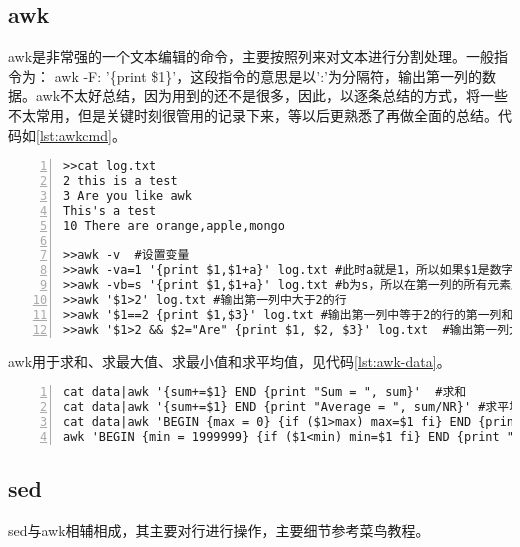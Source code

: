 \subsection{awk}
awk是非常强的一个文本编辑的命令，主要按照列来对文本进行分割处理。一般指令为： awk -F: '\{print \$1\}'，这段指令的意思是以':'为分隔符，输出第一列的数据。awk不太好总结，因为用到的还不是很多，因此，以逐条总结的方式，将一些不太常用，但是关键时刻很管用的记录下来，等以后更熟悉了再做全面的总结。代码如\ref{lst:awkcmd}。
\begin{lstlisting}[language = shell, numbers=left, label={lst:awkcmd},
     numberstyle=\tiny,keywordstyle=\color{blue!70}, caption={grep指令的一般性操作}
     commentstyle=\color{red!50!green!50!blue!50},frame=shadowbox,
     rulesepcolor=\color{red!20!green!20!blue!20},basicstyle=\ttfamily]
>>cat log.txt
2 this is a test
3 Are you like awk
This's a test
10 There are orange,apple,mongo

>>awk -v  #设置变量
>>awk -va=1 '{print $1,$1+a}' log.txt #此时a就是1，所以如果$1是数字，那么数字加一，如果不是，那么输出就是1
>>awk -vb=s '{print $1,$1+a}' log.txt #b为s，所以在第一列的所有元素后面加个s
>>awk '$1>2' log.txt #输出第一列中大于2的行
>>awk '$1==2 {print $1,$3}' log.txt #输出第一列中等于2的行的第一列和第三列
>>awk '$1>2 && $2="Are" {print $1, $2, $3}' log.txt  #输出第一列大于2的行的第一、二和三列
\end{lstlisting}

awk用于求和、求最大值、求最小值和求平均值，见代码\ref{lst:awk-data}。
\begin{lstlisting}[language = shell, numbers=left, label={lst:awk-data},
     numberstyle=\tiny,keywordstyle=\color{blue!70}, caption={grep指令的一般性操作}
     commentstyle=\color{red!50!green!50!blue!50},frame=shadowbox,
     rulesepcolor=\color{red!20!green!20!blue!20},basicstyle=\ttfamily]
cat data|awk '{sum+=$1} END {print "Sum = ", sum}'  #求和
cat data|awk '{sum+=$1} END {print "Average = ", sum/NR}' #求平均值
cat data|awk 'BEGIN {max = 0} {if ($1>max) max=$1 fi} END {print "Max=", max}' #求最大值
awk 'BEGIN {min = 1999999} {if ($1<min) min=$1 fi} END {print "Min=", min}' #求最小值
\end{lstlisting}
\subsection{sed}
sed与awk相辅相成，其主要对行进行操作，主要细节参考菜鸟教程。

